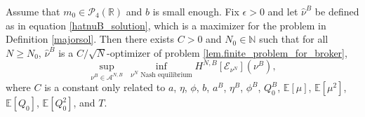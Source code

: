 \documentclass[10pt,a4paper]{amsart}
\begin{document}
\begin{theorem}\label{thm.finite_1}
Assume that $m_0 \in \mathcal{P}_4(\mathbb{R})$ and $b$ is small enough. Fix $\epsilon > 0$ and let $\hat{\nu}^B$ be defined as in equation \eqref{hatnuB_solution}, which is a maximizer for the problem in Definition \ref{majorsol}. 
Then there exists $C>0$ and $N_0 \in \mathbb{N}$ such that for all $N \geq N_0$, $\hat{\nu}^B$ is a $C/\sqrt{N}$-optimizer of problem \eqref{lem.finite_problem_for_broker},
$$\underset{\nu^B \in \mathcal{A}^{N,B}}{\sup} ~\underset{\nu^N \text{~Nash equilibrium}}{\inf} H^{N,B}\left[\mathcal{E}_{\nu^N}\right]\left(\nu^B\right),$$
where $C$ is a constant only related to $a$, $\eta$, $\phi$, $b$, $a^B$, $\eta^B$, $\phi^B$, $Q_0^B$, $\mathbb{E}[\mu]$, $\mathbb{E}[\mu^2]$, $\mathbb{E}[Q_0]$, $\mathbb{E}[Q_0^2]$, and $T$.
\end{theorem}
\end{document}

